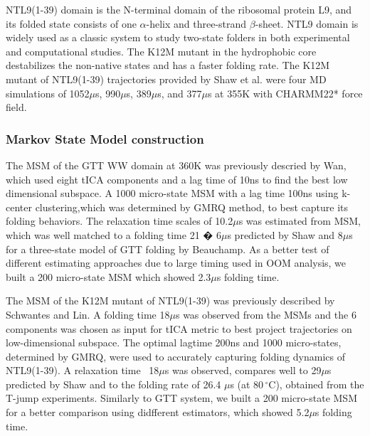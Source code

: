 \documentclass[%
 aip,
rsi,%
 amsmath,amssymb,
 reprint,%
]{revtex4-1}
\begin{document}
NTL9(1-39) domain is the N-terminal domain of the ribosomal protein L9, and its folded state consists of one $\alpha$-helix and three-strand $\beta$-sheet. NTL9 domain is widely used as a classic system to study  two-state folders in both experimental and computational studies\cite{Cho:2004dp,Cho:2005is,Voelz:2010hsa,Hoffman:1994hk,Schwantes:2013bpa}. The K12M mutant in the hydrophobic core destabilizes the non-native states and has a faster folding rate\cite{Cho:2014fla}. The K12M mutant of NTL9(1-39) trajectories provided by Shaw et al. were four MD simulations of 1052$\mu$s, 990$\mu$s, 389$\mu$s, and 377$\mu$s at 355K with CHARMM22* force field\cite{LindorffLarsen:2011gla}.

\subsubsection{Markov State Model construction}

The MSM of the GTT WW domain at 360K was previously descried by Wan\cite{WAN:2016fz}, which used eight tICA components and a lag time of 10ns to find the best low dimensional subspace. A 1000 micro-state MSM with a lag time 100ns using k-center clustering,which was determined by GMRQ method,\cite{McGibbon:2015gm} to best capture its folding behaviors. The relaxation time scales of 10.2$\mu$s was estimated from MSM, which was well matched to a folding time 21 � 6$\mu$s predicted by Shaw\cite{LindorffLarsen:2011gla} and 8$\mu$s for a three-state model of GTT folding by Beauchamp\cite{Beauchamp:2012kp}. As a better test of different estimating approaches due to large timing used in OOM analysis, we built a 200 micro-state MSM which showed 2.3$\mu$s folding time. 

The MSM of the K12M mutant of NTL9(1-39) was previously described by  Schwantes and Lin\cite{Schwantes:2013bpa,Baiz:2014gm,Beauchamp:2012kp}. A folding time 18$\mu$s was observed from the MSMs and the 6 components was chosen as input for tICA metric to best project trajectories on low-dimensional subspace. The optimal lagtime 200ns and 1000 micro-states, determined by GMRQ\cite{McGibbon:2015gma}, were used to accurately capturing folding dynamics of NTL9(1-39). A relaxation time ~18$\mu$s was observed, compares well to 29$\mu$s predicted by Shaw\cite{LindorffLarsen:2011gla} and to the folding rate of 26.4 $\mu$s (at 80$\,^{\circ}\mathrm{C}$), obtained from the T-jump experiments\cite{Baiz:2014gm}. Similarly to GTT system, we built a 200 micro-state MSM for a better comparison using didfferent estimators, which showed 5.2$\mu$s folding time.
\end{document}
